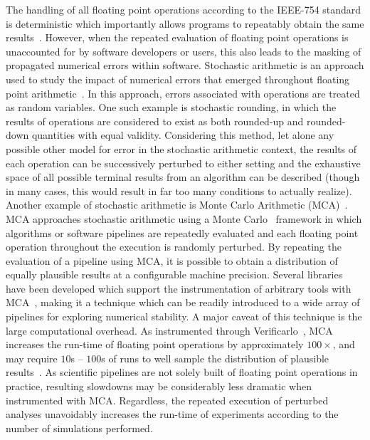 The handling of all floating point operations according to the IEEE-754 standard is deterministic which importantly
allows programs to repeatably obtain the same results~\cite{ieee754}. However, when the repeated evaluation of floating
point operations is unaccounted for by software developers or users, this also leads to the masking of propagated
numerical errors within software. Stochastic arithmetic is an approach used to study the impact of numerical errors that
emerged throughout floating point arithmetic~\cite{vignes1993stochastic,connolly2020stochastic}. In this approach, errors
associated with operations are treated as random variables. One such example is stochastic rounding, in which the results
of operations are considered to exist as both rounded-up and rounded-down quantities with equal validity. Considering
this method, let alone any possible other model for error in the stochastic arithmetic context, the results of each
operation can be successively perturbed to either setting and the exhaustive space of all possible terminal results
from an algorithm can be described (though in many cases, this would result in far too many conditions to actually
realize). Another example of stochastic arithmetic is Monte Carlo Arithmetic (MCA)~\cite{Parker1997-qq}. MCA
approaches stochastic arithmetic using a Monte Carlo~\cite{metropolis1949monte} framework in which algorithms or software
pipelines are repeatedly evaluated and each floating point operation throughout the execution is randomly perturbed. By
repeating the evaluation of a pipeline using MCA, it is possible to obtain a distribution of equally plausible results at
a configurable machine precision. Several libraries have been developed which support the instrumentation of arbitrary
tools with MCA~\cite{frechtling2015mcalib,Denis2016-wo}, making it a technique which can be readily introduced to a wide
array of pipelines for exploring numerical stability. A major caveat of this technique is the large computational
overhead. As instrumented through Verificarlo~\cite{Denis2016-wo}, MCA increases the run-time of floating point
operations by approximately $100 \times$, and may require $10$s – $100$s of runs to well sample the distribution of
plausible results~\cite{Sohier2018-ts}. As scientific pipelines are not solely built of floating point operations in
practice, resulting slowdowns may be considerably less dramatic when instrumented with MCA. Regardless, the repeated
execution of perturbed analyses unavoidably increases the run-time of experiments according to the number of simulations
performed.

